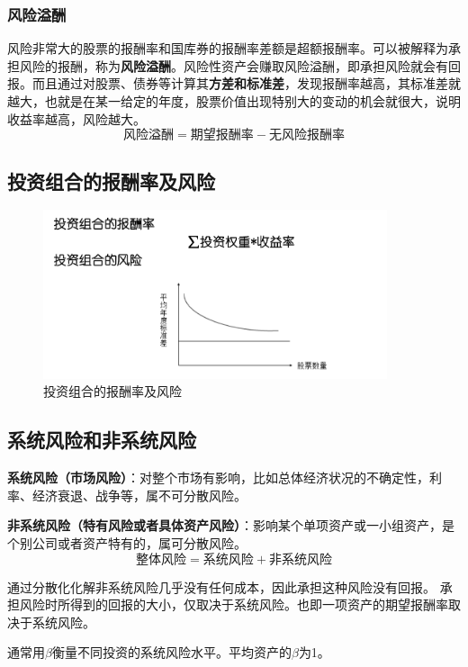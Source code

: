 \subsubsection{风险溢酬}
风险非常大的股票的报酬率和国库券的报酬率差额是超额报酬率。可以被解释为承担风险的报酬，称为\textbf{风险溢酬}。风险性资产会赚取风险溢酬，即承担风险就会有回报。而且通过对股票、债券等计算其\textbf{方差和标准差}，发现报酬率越高，其标准差就越大，也就是在某一给定的年度，股票价值出现特别大的变动的机会就很大，说明收益率越高，风险越大。
$$\mbox{风险溢酬}=\mbox{期望报酬率}-\mbox{无风险报酬率}$$

\subsection{投资组合的报酬率及风险}

\begin{figure}[H]
    \centering
    \includegraphics[width=0.9\textwidth]{image/投资组合的报酬率及风险.png}
    \caption{投资组合的报酬率及风险}
    \label{fig:10}
\end{figure}

\subsection{系统风险和非系统风险}
\textbf{系统风险（市场风险）}：对整个市场有影响，比如总体经济状况的不确定性，利率、经济衰退、战争等，属不可分散风险。

\textbf{非系统风险（特有风险或者具体资产风险）}：影响某个单项资产或一小组资产，是个别公司或者资产特有的，属可分散风险。
$$\mbox{整体风险}=\mbox{系统风险}+\mbox{非系统风险}$$

通过分散化化解非系统风险几乎没有任何成本，因此承担这种风险没有回报。
承担风险时所得到的回报的大小，仅取决于系统风险。也即一项资产的期望报酬率取决于系统风险。

通常用$\beta$衡量不同投资的系统风险水平。平均资产的$\beta$为1。

